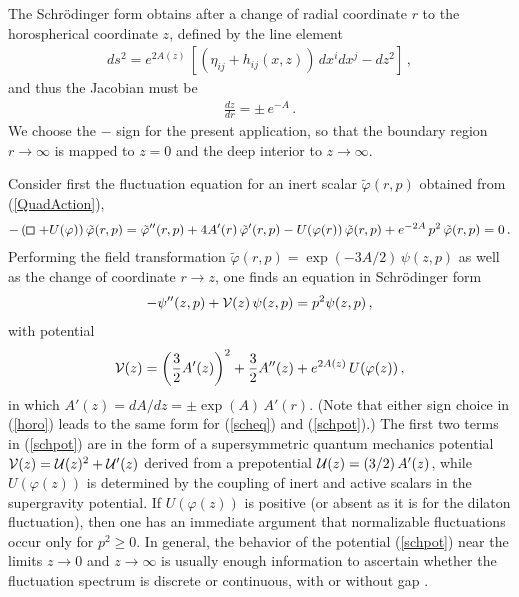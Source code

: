 \documentclass[a4paper,12pt]{article}
\def\varphit{\tilde{\varphi}}
\def\sqr#1#2{{\vcenter{\vbox{\hrule height.#2pt
         \hbox{\vrule width.#2pt height#1pt \kern#1pt
            \vrule width.#2pt}
         \hrule height.#2pt}}}}
\def\square{\mathop{\mathchoice\sqr56\sqr56\sqr{3.75}4\sqr34\,}\nolimits}
\begin{document}
The Schr\"odinger form obtains after a change of radial coordinate $r$
to the horospherical coordinate $z$, defined by the line element
\begin{eqnarray}
ds^2 = e^{2A(z)} \, \left[ (\eta_{ij} + h_{ij}(x,z)) \, dx^i dx^j - dz^2 \right] \,,
\end{eqnarray}
and thus the Jacobian must be
\begin{eqnarray}
\label{horo}
\frac{dz}{dr} = \pm \, e^{-A} \,.
\end{eqnarray}
We choose the $-$ sign for the present application, so that the
boundary region $r \rightarrow \infty$ is mapped to $z=0$ and the deep
interior to $z \rightarrow \infty$.

Consider first the fluctuation equation for an inert scalar
$\varphit(r,p)$ obtained from (\ref{QuadAction}),
\begin{eqnarray}
\label{inerteq}
- \left( \square + U(\varphi) \right)  \varphit(r,p) = \varphit''(r,p) 
+ 4 A'(r) \, \varphit'(r,p) - U(\varphi(r)) \, \varphit(r,p) + e^{-2A}
 \, p^2 \, \varphit(r,p) = 0 \,.  
\end{eqnarray}
Performing the field transformation $\varphit(r,p) = \exp(-3A/2) \,
\psi(z,p)$ as well as the change of coordinate $r \rightarrow z$, one
finds an equation in Schr\"odinger form
\begin{eqnarray}
\label{scheq}
- \psi''(z,p) + {\cal V}(z) \, \psi(z,p) = p^2 \psi(z,p) \,,
\end{eqnarray}
with potential
\begin{eqnarray}
\label{schpot}
{\cal V}(z) = \left( \frac{3}{2} A'(z) \right)^2 + \frac{3}{2} A''(z) +
e^{2A(z)} \, U(\varphi(z)) \,,
\end{eqnarray}
in which $A'(z) = dA/dz = \pm \exp(A) \, A'(r)$.  (Note that either
sign choice in (\ref{horo}) leads to the same form for (\ref{scheq})
and (\ref{schpot}).)  The first two terms in (\ref{schpot}) are in the
form of a supersymmetric quantum mechanics potential ${\cal V}(z) =
{\cal U}(z)^2 + {\cal U}'(z)$ derived from a prepotential ${\cal U}(z)
= (3/2) \, A'(z)$, while $U(\varphi(z))$ is determined by the coupling
of inert and active scalars in the supergravity potential.  If
$U(\varphi(z))$ is positive (or absent as it is for the dilaton
fluctuation), then one has an immediate argument that normalizable
fluctuations occur only for $p^2 \geq 0$.  In general, the behavior
of the potential (\ref{schpot}) near the limits $z \rightarrow 0$ and
$z \rightarrow \infty$ is usually enough information to ascertain
whether the fluctuation spectrum is discrete or continuous, with or
without gap \cite{fgpw2}.
\end{document}
